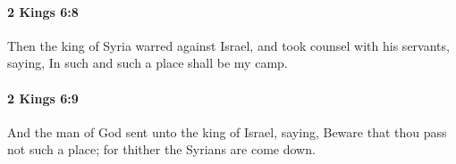 		\paragraph{2 Kings 6:8} %
			\label{2KINGS-6-8}

			Then the king of Syria warred against Israel, and took counsel with his servants, saying, In such and such a place shall be my camp.


		\paragraph{2 Kings 6:9} %
			\label{2KINGS-6-9}

			And the man of God sent unto the king of Israel, saying, Beware that thou pass not such a place; for thither the Syrians are come down.


